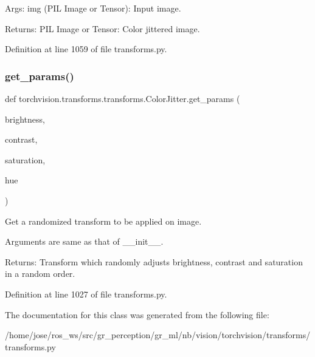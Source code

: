 \begin{DoxyVerb}Args:
    img (PIL Image or Tensor): Input image.

Returns:
    PIL Image or Tensor: Color jittered image.
\end{DoxyVerb}
 

Definition at line 1059 of file transforms.\+py.

\mbox{\label{classtorchvision_1_1transforms_1_1transforms_1_1ColorJitter_a05259a1f267e59cc310ed99e9f5b0415}} 
\subsubsection{\texorpdfstring{get\+\_\+params()}{get\_params()}}
{\footnotesize\ttfamily def torchvision.\+transforms.\+transforms.\+Color\+Jitter.\+get\+\_\+params (\begin{DoxyParamCaption}\item[{}]{brightness,  }\item[{}]{contrast,  }\item[{}]{saturation,  }\item[{}]{hue }\end{DoxyParamCaption})\hspace{0.3cm}{\ttfamily [static]}}

\begin{DoxyVerb}Get a randomized transform to be applied on image.

Arguments are same as that of __init__.

Returns:
    Transform which randomly adjusts brightness, contrast and
    saturation in a random order.
\end{DoxyVerb}
 

Definition at line 1027 of file transforms.\+py.



The documentation for this class was generated from the following file\+:\begin{DoxyCompactItemize}
\item 
/home/jose/ros\+\_\+ws/src/gr\+\_\+perception/gr\+\_\+ml/nb/vision/torchvision/transforms/transforms.\+py\end{DoxyCompactItemize}
